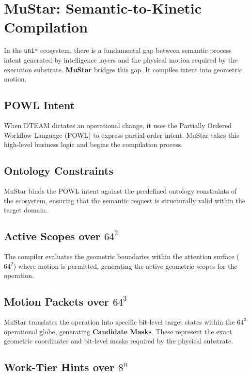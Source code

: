 \chapter{MuStar: Semantic-to-Kinetic Compilation}

In the \texttt{uni*} ecosystem, there is a fundamental gap between semantic process intent generated by intelligence layers and the physical motion required by the execution substrate. \textbf{MuStar} bridges this gap. It compiles intent into geometric motion.

\section{POWL Intent}

When DTEAM dictates an operational change, it uses the Partially Ordered Workflow Language (POWL) to express partial-order intent. MuStar takes this high-level business logic and begins the compilation process.

\section{Ontology Constraints}

MuStar binds the POWL intent against the predefined ontology constraints of the ecosystem, ensuring that the semantic request is structurally valid within the target domain.

\section{Active Scopes over $64^2$}

The compiler evaluates the geometric boundaries within the attention surface ($64^2$) where motion is permitted, generating the active geometric scopes for the operation.

\section{Motion Packets over $64^3$}

MuStar translates the operation into specific bit-level target states within the $64^3$ operational globe, generating \textbf{Candidate Masks}. These represent the exact geometric coordinates and bit-level masks required by the physical substrate.

\section{Work-Tier Hints over $8^n$}

